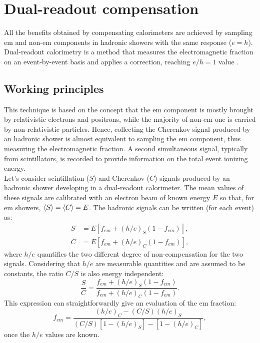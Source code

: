 \section{Dual-readout compensation}\label{sec:DRComp}
All the benefits obtained by compensating calorimeters are achieved by sampling em and non-em components in hadronic showers with the same response ($e=h$). Dual-readout calorimetry is a method that measures the electromagnetic fraction on an event-by-event basis and applies a correction, reaching $e/h = 1$ value \cite{DR_Wig}. 

\subsection{Working principles}
This technique is based on the concept that the em component is mostly brought by relativistic electrons and positrons, while the majority of non-em one is carried by non-relativistic particles. Hence, collecting the Cherenkov signal produced by an hadronic shower is almost equivalent to sampling the em component, thus measuring the electromagnetic fraction. A second simultaneous signal, typically from scintillators, is recorded to provide information on the total event ionizing energy.\\ %

Let's consider scintillation ($S$) and Cherenkov ($C$) signals produced by an hadronic shower developing in a dual-readout calorimeter. The mean values of these signals are calibrated with an electron beam of known energy $E$ so that, for em showers, $\expval{S} = \expval{C} = E$. The hadronic signals can be written (for each event) as:
\begin{align}
    S &= E \left[f_{em} + (h/e)_S (1-f_{em}) \right], \label{eq:S} \\
    C &= E \left[f_{em} + (h/e)_C (1-f_{em}) \right], \label{eq:C}
\end{align}
where $h/e$ quantifies the two different degree of non-compensation for the two signals. Considering that $h/e$ are measurable quantities and are assumed to be constants, the ratio $C/S$ is also energy independent:
\begin{equation}
    \frac{S}{C} = \frac{f_{em} + (h/e)_S (1-f_{em})}{f_{em} + (h/e)_C (1-f_{em})}. \label{eq:em_frac}
\end{equation}
This expression can straightforwardly give an evaluation of the em fraction:
\begin{equation}
    f_{em} = \frac{(h/e)_C-(C/S)(h/e)_S}{(C/S)\left[1-(h/e)_S\right]-\left[1-(h/e)_C\right]},
\end{equation}
once the $h/e$ values are known.\\


